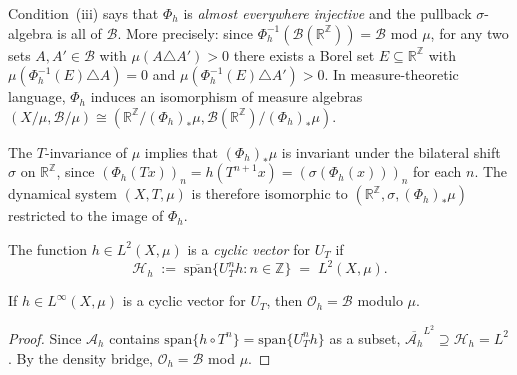 \begin{remark}
\label{rem:embedding}
Condition~(iii) says that $\Phi_h$ is \emph{almost everywhere injective} and
the pullback $\sigma$-algebra is all of $\mathcal{B}$.  More precisely: since
$\Phi_h^{-1}(\mathcal{B}(\mathbb{R}^\mathbb{Z})) = \mathcal{B}$ mod $\mu$, for
any two sets $A, A' \in \mathcal{B}$ with $\mu(A \triangle A') > 0$ there exists
a Borel set $E \subseteq \mathbb{R}^\mathbb{Z}$ with
$\mu(\Phi_h^{-1}(E) \triangle A) = 0$ and
$\mu(\Phi_h^{-1}(E) \triangle A') > 0$.  In measure-theoretic language,
$\Phi_h$ induces an isomorphism of measure algebras
$(X/\mu, \mathcal{B}/\mu) \cong (\mathbb{R}^\mathbb{Z}/(\Phi_h)_*\mu,
\mathcal{B}(\mathbb{R}^\mathbb{Z})/(\Phi_h)_*\mu)$.

The $T$-invariance of $\mu$ implies that $(\Phi_h)_*\mu$ is invariant under
the bilateral shift $\sigma$ on $\mathbb{R}^\mathbb{Z}$, since
$(\Phi_h(Tx))_n = h(T^{n+1}x) = (\sigma(\Phi_h(x)))_n$ for each $n$.  The
dynamical system $(X, T, \mu)$ is therefore isomorphic to
$(\mathbb{R}^\mathbb{Z}, \sigma, (\Phi_h)_*\mu)$ restricted to the image of
$\Phi_h$.
\end{remark}

\begin{definition}
\label{def:cyclic}
The function $h \in L^2(X, \mu)$ is a \emph{cyclic vector} for $U_T$ if
\[
  \mathcal{H}_h
  \;:=\;
  \overline{\mathrm{span}}\!\bigl\{U_T^n h : n \in \mathbb{Z}\bigr\}
  \;=\; L^2(X, \mu).
\]
\end{definition}

\begin{corollary}
\label{cor:cyclic-implies-reconstruction}
If $h \in L^\infty(X, \mu)$ is a cyclic vector for $U_T$, then
$\mathcal{O}_h = \mathcal{B}$ modulo $\mu$.
\end{corollary}

\begin{proof}
Since $\mathcal{A}_h$ contains $\mathrm{span}\{h \circ T^n\} =
\mathrm{span}\{U_T^n h\}$ as a subset, $\overline{\mathcal{A}_h}^{L^2}
\supseteq \mathcal{H}_h = L^2$.  By the density bridge, $\mathcal{O}_h =
\mathcal{B}$ mod $\mu$.
\end{proof}

